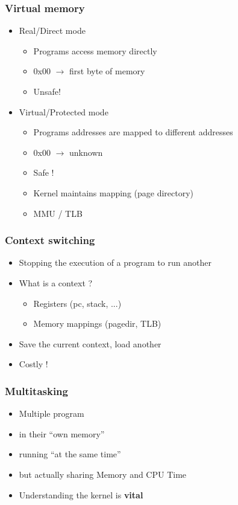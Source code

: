 \begin{frame}
  \frametitle{Virtual memory}

  \begin{itemize}
  \item Real/Direct mode
    \begin{itemize}
    \item Programs access memory directly
    \item 0x00 $\rightarrow$ first byte of memory
    \item Unsafe!
    \end{itemize}
  \item Virtual/Protected mode
    \begin{itemize}
    \item Programs addresses are mapped to different addresses
    \item 0x00 $\rightarrow$ unknown
    \item Safe !
    \item Kernel maintains mapping (page directory)
    \item MMU / TLB
    \end{itemize}
  \end{itemize}
\end{frame}


\begin{frame}
  \frametitle{Context switching}

  \begin{itemize}
  \item Stopping the execution of a program to run another
  \item What is a context ?
    \begin{itemize}
    \item Registers (pc, stack, ...)
    \item Memory mappings (pagedir, TLB)
    \end{itemize}
  \item Save the current context, load another
  \item Costly !
  \end{itemize}
\end{frame}


\begin{frame}
  \frametitle{Multitasking}

  \begin{itemize}
  \item Multiple program
  \item in their ``own memory''
  \item running ``at the same time''
  \item but actually sharing Memory and CPU Time
  \item Understanding the kernel is \textbf{vital}
  \end{itemize}
\end{frame}




